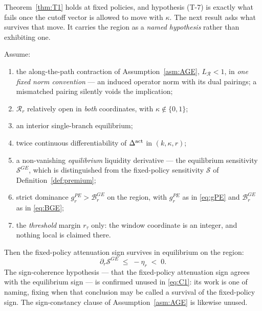 Theorem~\ref{thm:T1} holds at fixed policies, and hypothesis (T-7) is exactly what fails once the
cutoff vector is allowed to move with $\kappa$. The next result asks what survives that move. It
carries the region as a \emph{named hypothesis} rather than exhibiting one.

\begin{proposition}
\label{prop:C1}
Assume:
\begin{enumerate}[label=(C-\arabic*),leftmargin=3.2em,itemsep=3pt]
\item the along-the-path contraction of Assumption~\ref{asm:AGE}, $L_{\mathcal R} < 1$, in
  \emph{one fixed norm convention} --- an induced operator norm with its dual pairings; a mismatched
  pairing silently voids the implication;
\item $\mathcal R_r$ relatively open in \emph{both} coordinates, with $\kappa \notin \{0,1\}$;
\item an interior single-branch equilibrium;
\item twice continuous differentiability of $\Delta^{\mathrm{act}}$ in $(k,\kappa,r)$;
\item a non-vanishing \emph{equilibrium} liquidity derivative --- the equilibrium sensitivity
  $\mathcal S^{GE}$, which is distinguished from the fixed-policy sensitivity $\mathcal S$ of
  Definition~\ref{def:premium};
\item strict dominance $g_r^{PE} > \mathcal B_r^{GE}$ on the region, with $g_r^{PE}$ as in
  \eqref{eq:gPE} and $\mathcal B_r^{GE}$ as in \eqref{eq:BGE};
\item the \emph{threshold} margin $r_\tau$ only: the window coordinate is an integer, and nothing
  local is claimed there.
\end{enumerate}
Then the fixed-policy attenuation sign survives in equilibrium on the region:
\begin{equation}
\label{eq:C1}
\partial_r \mathcal S^{GE} \;\le\; -\eta_r \;<\; 0 .
\end{equation}
The sign-coherence hypothesis --- that the fixed-policy attenuation sign agrees with the equilibrium
sign --- is confirmed unused in \eqref{eq:C1}: its work is one of naming, fixing when that conclusion
may be called a survival of the fixed-policy sign. The sign-constancy clause of
Assumption~\ref{asm:AGE} is likewise unused.
\end{proposition}

